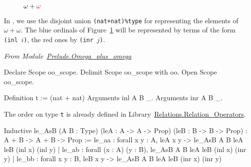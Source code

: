 \begin{figure}[h]
   \centering
   \caption{\textcolor{blue}{$\omega+{\color{red}\omega}$}}
   \label{fig:omega-plus-omega}
 \end{figure}

In \coq{}, we use the disjoint union \texttt{(nat+nat)\%type} for representing the elements of $\omega+\omega$.
The blue ordinals of Figure~\ref{fig:omega-plus-omega} will be represented by terms of the form \texttt{(inl $i$)},
the red ones by \texttt{(inr $j$)}.

\vspace{4pt}
\noindent\emph{From Module~\href{../src/html/hydras.Prelude.Omega_plus_omega.html}{Prelude.Omega\_plus\_omega}}


\begin{Coqsrc}
Declare Scope oo_scope.
Delimit Scope oo_scope with oo.
Open Scope oo_scope.

Definition t := (nat + nat)%
Arguments inl  {A B} _.
Arguments inr  {A B} _.
\end{Coqsrc}

The order on type \texttt{t} is already defined in
Library~\href{https://coq.inria.fr/distrib/current/stdlib/Coq.Relations.Relation_Operators.html}{Relations.Relation\_Operators}.

\begin{Coqanswer}
Inductive
le_AsB (A B : Type) (leA : A -> A -> Prop) (leB : B -> B -> Prop)
  : A + B -> A + B -> Prop :=
    le_aa : forall x y : A, leA x y -> le_AsB A B leA leB (inl x) (inl y)
  | le_ab : forall (x : A) (y : B), le_AsB A B leA leB (inl x) (inr y)
  | le_bb : forall x y : B, leB x y -> le_AsB A B leA leB (inr x) (inr y)
\end{Coqanswer}

